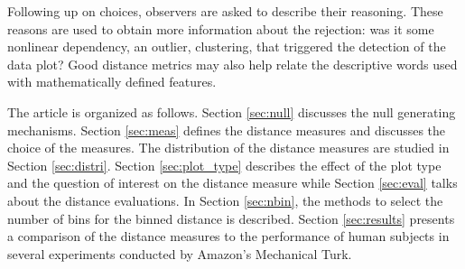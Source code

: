 \documentclass[12]{article}
\begin{document}

Following up on choices, observers are asked to describe their reasoning. These reasons are used to obtain more information about the rejection: was it some nonlinear dependency, an outlier, clustering, that triggered the detection of the data plot? Good distance metrics may also help relate the descriptive words used with mathematically defined features. 

The article is organized as follows. Section \ref{sec:null} discusses the null generating mechanisms. Section \ref{sec:meas} defines the distance measures and discusses the choice of the measures. The distribution of the distance measures are studied in Section \ref{sec:distri}. Section \ref{sec:plot_type} describes the effect of the plot type and the question of interest on the distance measure while Section \ref{sec:eval} talks about the distance evaluations. In Section \ref{sec:nbin}, the methods to select the number of bins for the binned distance is described. Section \ref{sec:results} presents a comparison of the distance measures to the performance of human subjects in several experiments conducted by Amazon's Mechanical Turk.




\end{document}
